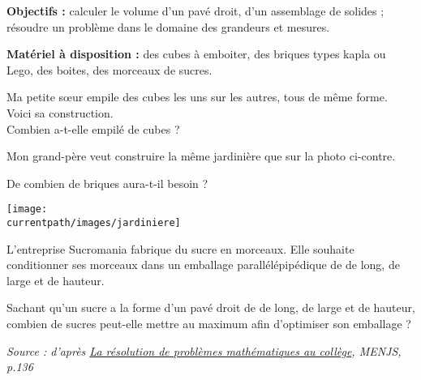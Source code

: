 \begin{changemargin}{-5mm}{-15mm}
\begin{activite}
    {\bf Objectifs :} calculer le volume d'un pavé droit, d'un assemblage de solides ; résoudre un problème dans le domaine des grandeurs et mesures.

    {\bf Matériel à disposition :} des cubes à emboiter, des briques types kapla ou Lego, des boites, des morceaux de sucres.
        \begin{minipage}{0.7\linewidth}
            Ma petite sœur empile des cubes les uns sur les autres, tous de même forme. Voici sa construction. \\
            Combien a-t-elle empilé de cubes ? 
            \vspace*{15mm}
        \end{minipage}
        \hfill
        \begin{minipage}{0.25\linewidth}
        \end{minipage}
        
        \begin{minipage}{0.6\linewidth}
            Mon grand-père veut construire la même jardinière que sur la photo ci-contre.

            De combien de briques aura-t-il besoin ?
            \vspace*{20mm}
        \end{minipage}
        \hfill
        \begin{minipage}{0.35\linewidth}
            \texttt{[image: \\currentpath/images/jardiniere]}
        \end{minipage}
        
        L’entreprise Sucromania fabrique du sucre en morceaux. Elle souhaite conditionner ses morceaux dans un emballage parallélépipédique de  de long,  de large et  de hauteur.

        Sachant qu’un sucre a la forme d’un pavé droit de  de long,  de large et  de hauteur, combien de sucres peut-elle mettre au maximum afin d’optimiser son emballage ?
        \vspace*{40mm}

        \hfill {\it\footnotesize Source : d'après \href{https://eduscol.education.fr/document/13132/download}{\og La résolution de problèmes mathématiques au collège}, MENJS, p.136}
        \vspace*{-40mm}
 \end{activite}
\end{changemargin}